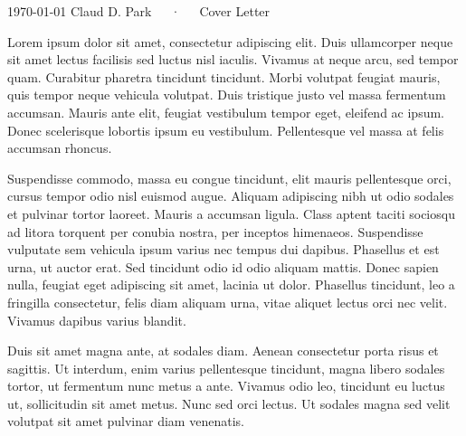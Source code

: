 \documentclass[11pt, a4paper]{awesome-cv}
\begin{document}
\makecvheader[R]

\makecvfooter
  {\today}
  {Claud D. Park~~~·~~~Cover Letter}
  {}

\makelettertitle

\begin{cvletter}

Lorem ipsum dolor sit amet, consectetur adipiscing elit. Duis ullamcorper neque sit amet lectus facilisis sed luctus nisl iaculis. Vivamus at neque arcu, sed tempor quam. Curabitur pharetra tincidunt tincidunt. Morbi volutpat feugiat mauris, quis tempor neque vehicula volutpat. Duis tristique justo vel massa fermentum accumsan. Mauris ante elit, feugiat vestibulum tempor eget, eleifend ac ipsum. Donec scelerisque lobortis ipsum eu vestibulum. Pellentesque vel massa at felis accumsan rhoncus.

Suspendisse commodo, massa eu congue tincidunt, elit mauris pellentesque orci, cursus tempor odio nisl euismod augue. Aliquam adipiscing nibh ut odio sodales et pulvinar tortor laoreet. Mauris a accumsan ligula. Class aptent taciti sociosqu ad litora torquent per conubia nostra, per inceptos himenaeos. Suspendisse vulputate sem vehicula ipsum varius nec tempus dui dapibus. Phasellus et est urna, ut auctor erat. Sed tincidunt odio id odio aliquam mattis. Donec sapien nulla, feugiat eget adipiscing sit amet, lacinia ut dolor. Phasellus tincidunt, leo a fringilla consectetur, felis diam aliquam urna, vitae aliquet lectus orci nec velit. Vivamus dapibus varius blandit.

Duis sit amet magna ante, at sodales diam. Aenean consectetur porta risus et sagittis. Ut interdum, enim varius pellentesque tincidunt, magna libero sodales tortor, ut fermentum nunc metus a ante. Vivamus odio leo, tincidunt eu luctus ut, sollicitudin sit amet metus. Nunc sed orci lectus. Ut sodales magna sed velit volutpat sit amet pulvinar diam venenatis.

\end{cvletter}


\makeletterclosing
\end{document}
